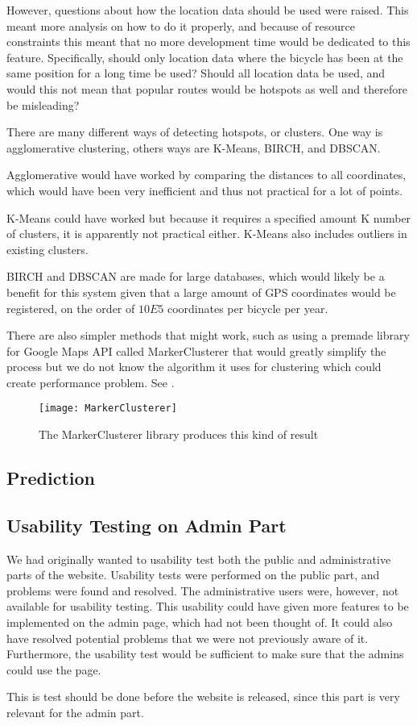 However, questions about how the location data should be used were raised.
This meant more analysis on how to do it properly, and because of resource constraints this meant that no more development time would be dedicated to this feature. 
Specifically, should only location data where the bicycle has been at the same position for a long time be used? 
Should all location data be used, and would this not mean that popular routes would be hotspots as well and therefore be misleading? 

There are many different ways of detecting hotspots, or clusters. One way is agglomerative clustering, others ways are K-Means, BIRCH, and DBSCAN.

Agglomerative would have worked by comparing the distances to all coordinates, which would have been very inefficient and thus not practical for a lot of points. 

K-Means could have worked but because it requires a specified amount K number of clusters, it is apparently not practical either. K-Means also includes outliers in existing clusters.

BIRCH and DBSCAN are made for large databases, which would likely be a benefit for this system given that a large amount of GPS coordinates would be registered, on the order of $10E5$ coordinates per bicycle per year. 

There are also simpler methods that might work, such as using a premade library for Google Maps API called MarkerClusterer that would greatly simplify the process but we do not know the algorithm it uses for clustering which could create performance problem. See .

\begin{figure}[h]
\begin{center}
\texttt{[image: MarkerClusterer]}
\caption{The MarkerClusterer library produces this kind of result}
\label{fig:markerclusterer}
\end{center}
\end{figure}

\subsection{Prediction}

\subsection{Usability Testing on Admin Part}
We had originally wanted to usability test both the public and administrative parts of the website.
Usability tests were performed on the public part, and problems were found and resolved. 
The administrative users were, however, not available for usability testing.
This usability could have given more features to be implemented on the admin page, which had not been thought of.
It could also have resolved potential problems that we were not previously aware of it.
Furthermore, the usability test would be sufficient to make sure that the admins could use the page.

This is test should be done before the website is released, since this part is very relevant for the admin part.
